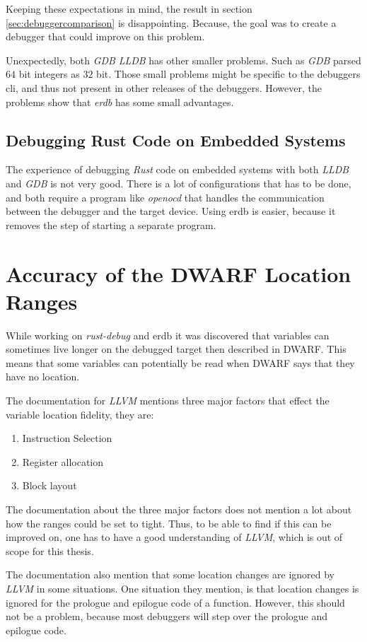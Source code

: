 Keeping these expectations in mind, the result in section \ref{sec:debuggercomparison} is disappointing.
Because, the goal was to create a debugger that could improve on this problem.


Unexpectedly, both \emph{GDB} \emph{LLDB} has other smaller problems.
Such as \emph{GDB} parsed $64$ bit integers as $32$ bit.
Those small problems might be specific to the debuggers \gls{cli}, and thus not present in other releases of the debuggers.
However, the problems show that \emph{erdb} has some small advantages.


\subsection{Debugging Rust Code on Embedded Systems}
The experience of debugging \emph{Rust} code on embedded systems with both \emph{LLDB} and \emph{GDB} is not very good.
There is a lot of configurations that has to be done, and both require a program like \emph{openocd} that handles the communication between the debugger and the target device.
Using \gls{erdb} is easier, because it removes the step of starting a separate program.


\section{Accuracy of the \gls{DWARF} Location Ranges}\label{section:loc-ranges}
While working on \emph{rust-debug} and \gls{erdb} it was discovered that variables can sometimes live longer on the debugged target then described in \gls{DWARF}.
This means that some variables can potentially be read when \gls{DWARF} says that they have no location.


The documentation for \emph{LLVM} \cite{llvm-dbs} mentions three major factors that effect the variable location fidelity, they are:

\begin{enumerate}
  \item Instruction Selection
  \item Register allocation
  \item Block layout
\end{enumerate}

The documentation about the three major factors does not mention a lot about how the ranges could be set to tight.
Thus, to be able to find if this can be improved on, one has to have a good understanding of \emph{LLVM}, which is out of scope for this thesis.


The documentation also mention that some location changes are ignored by \emph{LLVM} in some situations.
One situation they mention, is that location changes is ignored for the prologue and epilogue code of a function.
However, this should not be a problem, because most debuggers will step over the prologue and epilogue code.

